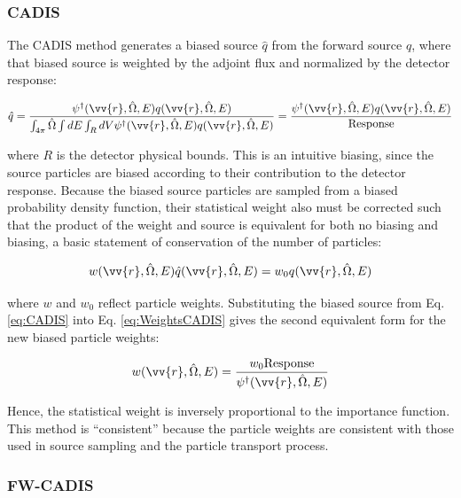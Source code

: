 \documentclass[10pt]{article}
\newcommand{\hO}{\hat{\Omega}}
\begin{document}
\begin{flushleft}
\subsubsection{CADIS}

The CADIS method generates a biased source \(\hat{q}\) from the forward source \(q\), where that biased source is weighted by the adjoint flux and normalized by the detector response:

\begin{equation}
\label{eq:CADIS}
\begin{aligned}
\hat{q}= \frac{\psi^\dagger(\vv{r},\hO  ,E)q(\vv{r},\hO  ,E)}{\int_{4\pi}\hO  \int dE\int_RdV\psi^\dagger(\vv{r},\hO  ,E)q(\vv{r},\hO  ,E)}= \frac{\psi^\dagger(\vv{r},\hO  ,E)q(\vv{r},\hO  ,E)}{\textrm{Response}}\\
\end{aligned}
\end{equation}

where \(R\) is the detector physical bounds. This is an intuitive biasing, since the source particles are biased according to their contribution to the detector response. Because the biased source particles are sampled from a biased probability density function, their statistical weight also must be corrected such that the product of the weight and source is equivalent for both no biasing and biasing, a basic statement of conservation of the number of particles:

\begin{equation}
\label{eq:WeightsCADIS}
w(\vv{r},\hO  ,E)\hat{q}(\vv{r},\hO  ,E)=w_0q(\vv{r},\hO  ,E)
\end{equation}

where \(w\) and \(w_0\) reflect particle weights. Substituting the biased source from Eq. \eqref{eq:CADIS} into Eq. \eqref{eq:WeightsCADIS} gives the second equivalent form for the new biased particle weights:

\begin{equation}
\label{eq:WeightsCADIS2}
w(\vv{r},\hO  ,E)=\frac{w_0\textrm{Response}}{\psi^\dagger(\vv{r},\hO  ,E)}
\end{equation}

Hence, the statistical weight is inversely proportional to the importance function. This method is ``consistent'' because the particle weights are consistent with those used in source sampling and the particle transport process.

\subsubsection{FW-CADIS}


\end{flushleft}
\end{document}
